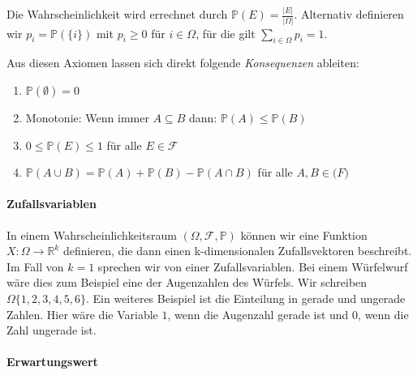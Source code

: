\vspace{5pt}

Die Wahrscheinlichkeit wird errechnet durch $ \mathbb{P}(E) = \frac{|E|}{|\Omega|}$.
Alternativ definieren wir $p_{i} = \mathbb{P} (\{i\})$ mit $p_{i} \geq 0$  
f\"ur $i \in \Omega$, f\"ur die gilt $\sum_{i\in \Omega} p_{i} =1$. 



\vspace{10pt}

Aus diesen Axiomen lassen sich direkt folgende \textit{Konsequenzen} ableiten:


\vspace{5pt}

\begin{enumerate}
	\item $\mathbb{P} (\emptyset) = 0$
	\item Monotonie: Wenn immer $A\subseteq B$ dann: $\mathbb{P} (A) \leq \mathbb{P} (B)$
	\item $0 \leq \mathbb{P} (E) \leq 1$   f\"ur alle $E \in \mathcal{F}$
	\item $ \mathbb{P} (A \cup B) = \mathbb{P} (A) + \mathbb{P} (B) - \mathbb{P} (A \cap B)$ f\"ur alle $A,B \in \mathcal(F)$
\end{enumerate}


\vspace{10pt}

\paragraph {Zufallsvariablen}

\vspace{5pt}

In einem Wahrscheinlichkeitsraum $(\Omega, \mathcal{F}, \mathbb{P})$ k\"onnen wir eine Funktion $X:\Omega \rightarrow \mathbb{R}^k$  definieren, die dann einen k-dimensionalen Zufallsvektoren beschreibt. Im Fall von $k=1$ sprechen wir von einer Zufallsvariablen.
Bei einem W\"urfelwurf w\"are dies zum Beispiel eine der Augenzahlen des W\"urfels. Wir schreiben $\Omega \{1,2,3,4,5,6\}$. 
Ein weiteres Beispiel ist die Einteilung in \glqq gerade\grqq{} und \glqq ungerade\grqq{} Zahlen. Hier w\"are die Variable $1$, wenn die Augenzahl gerade ist und $0$, wenn die Zahl ungerade ist.

\vspace{10pt}

\paragraph {Erwartungswert}

